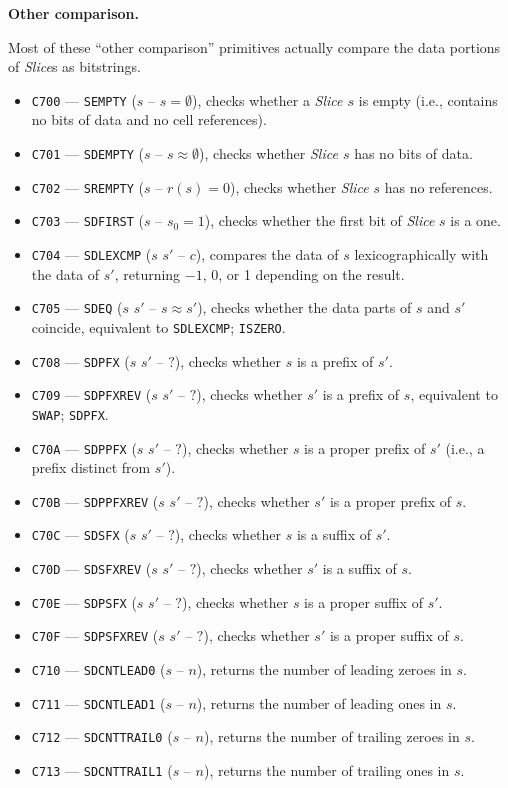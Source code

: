 \documentclass[12pt,oneside]{article}
\def\makepoint#1{\medbreak\noindent{\bf #1.\ }}
\def\nxsubpoint{\refstepcounter{subsubsection}%
  \smallbreak\makepoint{\thesubsubsection}}
\def\emb#1{\textbf{#1.}}
\begin{document}
\nxsubpoint\emb{Other comparison}

Most of these ``other comparison'' primitives actually compare the data portions of {\em Slice\/}s as bitstrings.

\begin{itemize}
\item {\tt C700} --- {\tt SEMPTY} ($s$ -- $s=\emptyset$), checks whether a {\em Slice\/ $s$} is empty (i.e., contains no bits of data and no cell references).
\item {\tt C701} --- {\tt SDEMPTY} ($s$ -- $s\approx\emptyset$), checks whether {\em Slice\/ $s$} has no bits of data.
\item {\tt C702} --- {\tt SREMPTY} ($s$ -- $r(s)=0$), checks whether {\em Slice\/} $s$ has no references.
\item {\tt C703} --- {\tt SDFIRST} ($s$ -- $s_0=1$), checks whether the first bit of {\em Slice\/} $s$ is a one.
\item {\tt C704} --- {\tt SDLEXCMP} ($s$ $s'$ -- $c$), compares the data of $s$ lexicographically with the data of $s'$, returning $-1$, 0, or 1 depending on the result.
\item {\tt C705} --- {\tt SDEQ} ($s$ $s'$ -- $s\approx s'$), checks whether the data parts of $s$ and $s'$ coincide, equivalent to {\tt SDLEXCMP}; {\tt ISZERO}.
\item {\tt C708} --- {\tt SDPFX} ($s$ $s'$ -- $?$), checks whether $s$ is a prefix of $s'$.
\item {\tt C709} --- {\tt SDPFXREV} ($s$ $s'$ -- $?$), checks whether $s'$ is a prefix of $s$, equivalent to {\tt SWAP}; {\tt SDPFX}.
\item {\tt C70A} --- {\tt SDPPFX} ($s$ $s'$ -- $?$), checks whether $s$ is a proper prefix of $s'$ (i.e., a prefix distinct from $s'$).
\item {\tt C70B} --- {\tt SDPPFXREV} ($s$ $s'$ -- $?$), checks whether $s'$ is a proper prefix of $s$.
\item {\tt C70C} --- {\tt SDSFX} ($s$ $s'$ -- $?$), checks whether $s$ is a suffix of $s'$.
\item {\tt C70D} --- {\tt SDSFXREV} ($s$ $s'$ -- $?$), checks whether $s'$ is a suffix of $s$.
\item {\tt C70E} --- {\tt SDPSFX} ($s$ $s'$ -- $?$), checks whether $s$ is a proper suffix of $s'$.
\item {\tt C70F} --- {\tt SDPSFXREV} ($s$ $s'$ -- $?$), checks whether $s'$ is a proper suffix of $s$.
\item {\tt C710} --- {\tt SDCNTLEAD0} ($s$ -- $n$), returns the number of leading zeroes in $s$.
\item {\tt C711} --- {\tt SDCNTLEAD1} ($s$ -- $n$), returns the number of leading ones in $s$.
\item {\tt C712} --- {\tt SDCNTTRAIL0} ($s$ -- $n$), returns the number of trailing zeroes in $s$.
\item {\tt C713} --- {\tt SDCNTTRAIL1} ($s$ -- $n$), returns the number of trailing ones in $s$.
\end{itemize}
\end{document}
